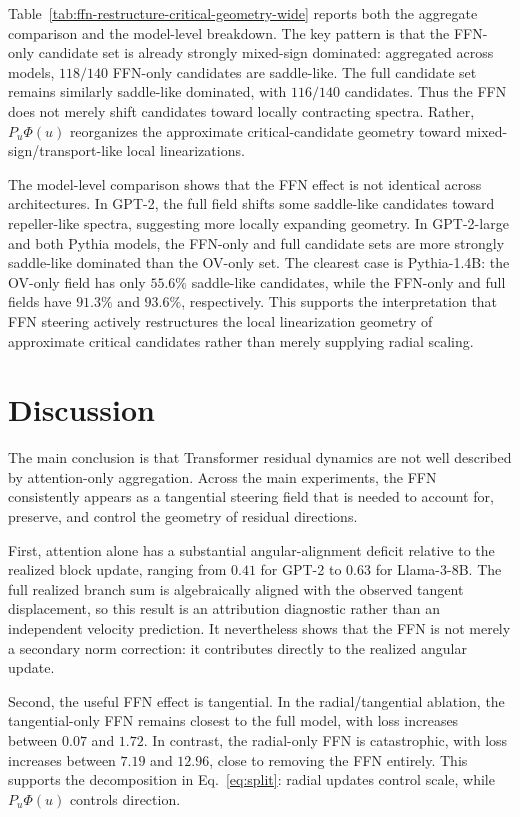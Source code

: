 \documentclass[11pt]{article}
\begin{document}
Table~\ref{tab:ffn-restructure-critical-geometry-wide} reports both the
aggregate comparison and the model-level breakdown. The key pattern is that
the FFN-only candidate set is already strongly mixed-sign dominated: aggregated
across models, $118/140$ FFN-only candidates are saddle-like. The full candidate
set remains similarly saddle-like dominated, with $116/140$ candidates. Thus the
FFN does not merely shift candidates toward locally contracting spectra. Rather,
$P_u\Phi(u)$ reorganizes the approximate critical-candidate geometry toward
mixed-sign/transport-like local linearizations.

The model-level comparison shows that the FFN effect is not identical across
architectures. In GPT-2, the full field shifts some saddle-like candidates toward
repeller-like spectra, suggesting more locally expanding geometry. In GPT-2-large
and both Pythia models, the FFN-only and full candidate sets are more strongly
saddle-like dominated than the OV-only set. The clearest case is Pythia-1.4B:
the OV-only field has only $55.6\%$ saddle-like candidates, while the FFN-only
and full fields have $91.3\%$ and $93.6\%$, respectively. This supports the
interpretation that FFN steering actively restructures the local linearization
geometry of approximate critical candidates rather than merely supplying radial
scaling.
\section{Discussion}

The main conclusion is that Transformer residual dynamics are not well described
by attention-only aggregation. Across the main experiments, the FFN consistently
appears as a tangential steering field that is needed to account for, preserve,
and control the geometry of residual directions.

First, attention alone has a substantial angular-alignment deficit relative to
the realized block update, ranging from $0.41$ for GPT-2 to $0.63$ for
Llama-3-8B. The full realized branch sum is algebraically aligned with the
observed tangent displacement, so this result is an attribution diagnostic rather
than an independent velocity prediction. It nevertheless shows that the FFN is
not merely a secondary norm correction: it contributes directly to the realized
angular update.

Second, the useful FFN effect is tangential. In the radial/tangential ablation,
the tangential-only FFN remains closest to the full model, with loss increases
between $0.07$ and $1.72$. In contrast, the radial-only FFN is catastrophic,
with loss increases between $7.19$ and $12.96$, close to removing the FFN
entirely. This supports the decomposition in Eq.~\eqref{eq:split}: radial
updates control scale, while $P_u\Phi(u)$ controls direction.
\end{document}

